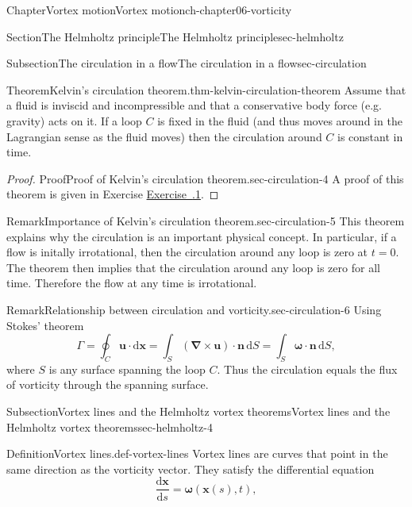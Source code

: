 \documentclass[oneside,10pt,]{book}
\newcommand{\xreffont}{\relax}
\numberwithin{equation}{section}
\newcommand{\de}{\mathrm{d}}
\newcommand{\dd}[2]{\frac{\de#1}{\de#2}}
\newcommand{\bx}{\boldsymbol{x}}
\newcommand{\bn}{\boldsymbol{n}}
\newcommand{\bu}{\boldsymbol{u}}
\newcommand{\bomega}{\boldsymbol{\omega}}
\newcommand{\bnabla}{\boldsymbol{\nabla}}
\begin{document}
\begin{chapterptx}{Chapter}{Vortex motion}{}{Vortex motion}{}{}{ch-chapter06-vorticity}
\begin{sectionptx}{Section}{The Helmholtz principle}{}{The Helmholtz principle}{}{}{sec-helmholtz}
\begin{subsectionptx}{Subsection}{The circulation in a flow}{}{The circulation in a flow}{}{}{sec-circulation}
\begin{theorem}{Theorem}{Kelvin's circulation theorem.}{}{thm-kelvin-circulation-theorem}%
Assume that a fluid is inviscid and incompressible and that a conservative body force (e.g. gravity) acts on it. If a loop \(C\) is fixed in the fluid (and thus moves around in the Lagrangian sense as the fluid moves) then the circulation around \(C\) is constant in time.%
\end{theorem}
\begin{proof}{Proof}{Proof of Kelvin's circulation theorem.}{sec-circulation-4}
A proof of this theorem is given in Exercise \hyperlink{ex-kelvin-circulation-theorem}{Exercise~{\xreffont 6.3.1}}.%
\end{proof}
\begin{remark}{Remark}{Importance of Kelvin's circulation theorem.}{sec-circulation-5}%
This theorem explains why the circulation is an important physical concept. In particular, if a flow is initally irrotational, then the circulation around any loop is zero at \(t=0\). The theorem then implies that the circulation around any loop is zero for all time. Therefore the flow at any time is irrotational.%
\end{remark}
\begin{remark}{Remark}{Relationship between circulation and vorticity.}{sec-circulation-6}%
Using Stokes' theorem%
\begin{equation}
\Gamma=\oint_C{\bu}\cdot \de{\bx}=\int_S\left(\bnabla\times{\bu}\right)\cdot{\bn}\,{\de}S
=\int_S\bomega\cdot{\bn}\,{\de}S,\label{eq-circulationvorticity}
\end{equation}
where \(S\) is any surface spanning the loop \(C\). Thus the circulation equals the flux of vorticity through the spanning surface.%
\end{remark}
\end{subsectionptx}
%
%
\typeout{************************************************}
\typeout{************************************************}
%
\begin{subsectionptx}{Subsection}{Vortex lines and the Helmholtz vortex theorems}{}{Vortex lines and the Helmholtz vortex theorems}{}{}{sec-helmholtz-4}
\begin{definition}{Definition}{Vortex lines.}{def-vortex-lines}%
Vortex lines are curves that point in the same direction as the vorticity vector. They satisfy the differential equation%
\begin{equation*}
\dd{\bx}{s}=\bomega(\bx(s),t),

\end{equation*}
\end{definition}
\end{subsectionptx}
\end{sectionptx}
\end{chapterptx}
\end{document}
